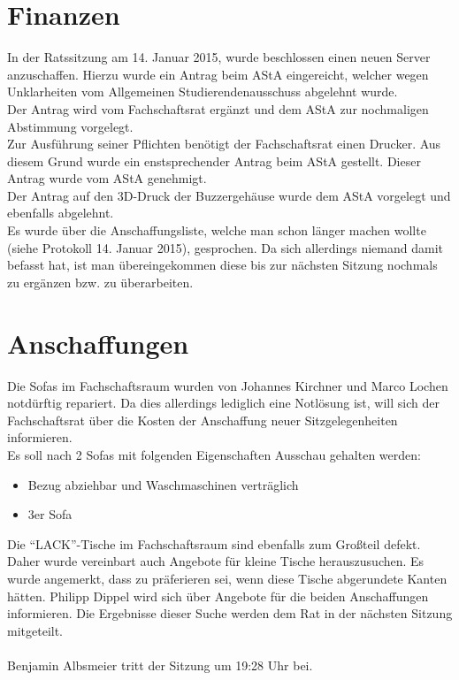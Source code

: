 \documentclass[a4paper, 11pt]{article} %
\newcommand{\abstimmung}[4]{
	\newcounter{summe}
	\setcounter{summe}{#3}
	\addtocounter{summe}{#4}
	\begin{flushleft}
		#1\\
	Es wird über den Antrag abgestimmt.
	\end{flushleft}
	\ifthenelse{\equal{#3}{0}\AND\equal{#4}{0}}{
	\begin{center}
		\textbf{Der Antrag wird einstimmig angenommen.}
	\end{center}
	}{
	\begin{center}
		#2 \ifthenelse{\equal{#2}{1}}{Stimme}{Stimmen} dafür, #3 \ifthenelse{\equal{#3}{1}}{Stimme}{Stimmen} dagegen, #4 \ifthenelse{\equal{#42}{1}}{Enthaltung}{Enthaltungen}\\
		\ifthenelse{#2>\value{summe}}{
		\textbf{Der Antrag ist somit angenommen.}
		}{
		\textbf{Der Antrag ist somit abgelehnt.}
		}
	\end{center}
	}  
}
\begin{document}
\section{Finanzen}
In der Ratssitzung am 14. Januar 2015, wurde beschlossen einen neuen Server anzuschaffen. Hierzu wurde ein Antrag beim AStA eingereicht, welcher wegen Unklarheiten vom Allgemeinen Studierendenausschuss abgelehnt wurde.\\
Der Antrag wird vom Fachschaftsrat ergänzt und dem AStA zur nochmaligen Abstimmung vorgelegt.\\
Zur Ausführung seiner Pflichten benötigt der Fachschaftsrat einen Drucker. Aus diesem Grund wurde ein enstsprechender Antrag beim AStA gestellt. Dieser Antrag wurde vom AStA genehmigt.\\
Der Antrag auf den 3D-Druck der Buzzergehäuse wurde dem AStA vorgelegt und ebenfalls abgelehnt.\\
Es wurde über die Anschaffungsliste, welche man schon länger machen wollte (siehe Protokoll 14. Januar 2015), gesprochen. Da sich allerdings niemand damit befasst hat, ist man übereingekommen diese bis zur nächsten Sitzung nochmals zu ergänzen bzw. zu überarbeiten.\\

\section{Anschaffungen}
Die Sofas im Fachschaftsraum wurden von Johannes Kirchner und Marco Lochen notdürftig repariert. Da dies allerdings lediglich eine Notlösung ist, will sich der Fachschaftsrat über die Kosten der Anschaffung neuer Sitzgelegenheiten informieren.\\
\newpage
Es soll nach 2 Sofas mit folgenden Eigenschaften Ausschau gehalten werden: 
\begin{itemize}
	\item Bezug abziehbar und Waschmaschinen verträglich
	\item 3er Sofa
\end{itemize}
Die "`LACK"'-Tische im Fachschaftsraum sind ebenfalls zum Großteil defekt. Daher wurde vereinbart auch Angebote für kleine Tische herauszusuchen.
Es wurde angemerkt, dass zu präferieren sei, wenn diese Tische abgerundete Kanten hätten.
Philipp Dippel wird sich über Angebote für die beiden Anschaffungen informieren. Die Ergebnisse dieser Suche werden dem Rat in der nächsten Sitzung mitgeteilt.\\\\
Benjamin Albsmeier tritt der Sitzung um 19:28 Uhr bei.
\end{document}

